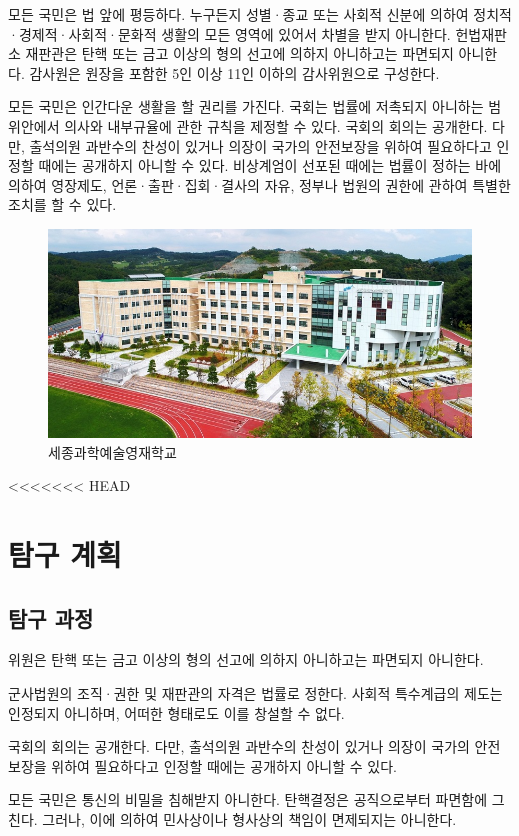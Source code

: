 \documentclass{thesis-SJ}
\begin{document}
	모든 국민은 법 앞에 평등하다. 누구든지 성별·종교 또는 사회적 신분에 의하여 정치적·경제적·사회적·문화적 생활의 모든 영역에 있어서 차별을 받지 아니한다. 헌법재판소 재판관은 탄핵 또는 금고 이상의 형의 선고에 의하지 아니하고는 파면되지 아니한다. 감사원은 원장을 포함한 5인 이상 11인 이하의 감사위원으로 구성한다.\cite{slater1994latex}
	
	모든 국민은 인간다운 생활을 할 권리를 가진다. 국회는 법률에 저촉되지 아니하는 범위안에서 의사와 내부규율에 관한 규칙을 제정할 수 있다. 국회의 회의는 공개한다. 다만, 출석의원 과반수의 찬성이 있거나 의장이 국가의 안전보장을 위하여 필요하다고 인정할 때에는 공개하지 아니할 수 있다. 비상계엄이 선포된 때에는 법률이 정하는 바에 의하여 영장제도, 언론·출판·집회·결사의 자유, 정부나 법원의 권한에 관하여 특별한 조치를 할 수 있다.
	
	
	\begin{figure}[ht]
		\centering
		\includegraphics[width=.75\linewidth]{images/school}
		\caption{세종과학예술영재학교}
		\label{fig:school}
	\end{figure}
	
<<<<<<< HEAD
	
	\chapter{탐구 계획}
	\section{탐구 과정}
	위원은 탄핵 또는 금고 이상의 형의 선고에 의하지 아니하고는 파면되지 아니한다.
	
	군사법원의 조직·권한 및 재판관의 자격은 법률로 정한다. 사회적 특수계급의 제도는 인정되지 아니하며, 어떠한 형태로도 이를 창설할 수 없다.
	
	국회의 회의는 공개한다. 다만, 출석의원 과반수의 찬성이 있거나 의장이 국가의 안전보장을 위하여 필요하다고 인정할 때에는 공개하지 아니할 수 있다.
	
	모든 국민은 통신의 비밀을 침해받지 아니한다. 탄핵결정은 공직으로부터 파면함에 그친다. 그러나, 이에 의하여 민사상이나 형사상의 책임이 면제되지는 아니한다.
	
\end{document}
